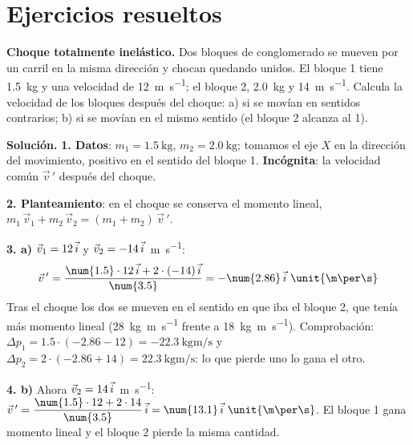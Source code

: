 
\section{Ejercicios resueltos}\label{sec:ud10-resueltos}

\begin{example}
    \textbf{Choque totalmente inelástico.} Dos bloques de conglomerado se mueven por un carril en la misma dirección y chocan
    quedando unidos. El bloque 1 tiene \qty{1.5}{\kg} y una velocidad de \qty{12}{\m\per\s}; el bloque 2, \qty{2.0}{\kg} y
    \qty{14}{\m\per\s}. Calcula la velocidad de los bloques después del choque: a) si se movían en sentidos contrarios; b) si se
    movían en el mismo sentido (el bloque 2 alcanza al 1).

    \textbf{Solución.} \textbf{1. Datos}: \(m_1 = \qty{1.5}{\kg}\), \(m_2 = \qty{2.0}{\kg}\); tomamos el eje \(X\) en la dirección del
    movimiento, positivo en el sentido del bloque 1. \textbf{Incógnita}: la velocidad común \(\vec{v}\,'\) después del choque.

    \textbf{2. Planteamiento}: en el choque se conserva el momento lineal, \(m_1\,\vec{v}_1 + m_2\,\vec{v}_2 = (m_1 + m_2)\,\vec{v}\,'\).

    \textbf{3. a)} \(\vec{v}_1 = 12\,\vec{i}\) y \(\vec{v}_2 = -14\,\vec{i}\)~\unit{\m\per\s}:
    \[ \vec{v}\,' = \frac{\num{1.5} \cdot 12\,\ivec + 2 \cdot (-14)\,\ivec}{\num{3.5}} = -\num{2.86}\,\ivec~\unit{\m\per\s} \]
    Tras el choque los dos se mueven en el sentido en que iba el bloque 2, que tenía más momento lineal (\qty{28}{\kg\m\per\s}
    frente a \qty{18}{\kg\m\per\s}). Comprobación: \(\Delta p_1 = \num{1.5} \cdot (\num{-2.86} - 12) = \qty{-22.3}{\kg\m\per\s}\) y
    \(\Delta p_2 = 2 \cdot (\num{-2.86} + 14) = \qty{+22.3}{\kg\m\per\s}\): lo que pierde uno lo gana el otro.

    \textbf{4. b)} Ahora \(\vec{v}_2 = 14\,\vec{i}\)~\unit{\m\per\s}:
    \(\vec{v}\,' = \dfrac{\num{1.5} \cdot 12 + 2 \cdot 14}{\num{3.5}}\,\ivec = \num{13.1}\,\ivec~\unit{\m\per\s}\). El bloque 1 gana
    momento lineal y el bloque 2 pierde la misma cantidad.
\end{example}

